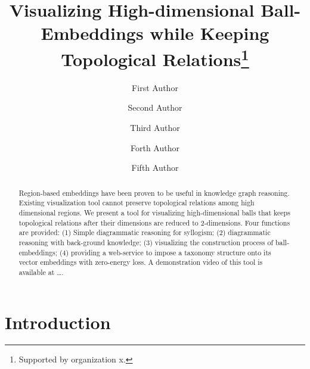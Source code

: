 \documentclass[runningheads]{llncs}
\begin{document}
%
\title{Visualizing High-dimensional Ball-Embeddings while Keeping Topological Relations\thanks{Supported by organization x.}}
%
%
\author{First Author \and
Second Author  \and
Third Author  \and
Forth Author  \and
Fifth Author}
%
%
%
\maketitle              %

\begin{abstract}
Region-based embeddings have been proven to be useful in knowledge graph reasoning. Existing visualization tool cannot preserve topological relations among high dimensional regions. We present a tool for visualizing high-dimensional balls that keeps topological relations after their dimensions are reduced to 2-dimensions. Four functions are provided: (1) Simple diagrammatic reasoning for syllogism; (2) diagrammatic reasoning with back-ground knowledge; (3) visualizing the construction process of ball-embeddings; (4) providing a web-service to impose a taxonomy structure onto its vector embeddings with zero-energy loss. A demonstration video of this tool is available at \dots. 
 
\end{abstract}
%
%
%
\section{Introduction}
\end{document}
